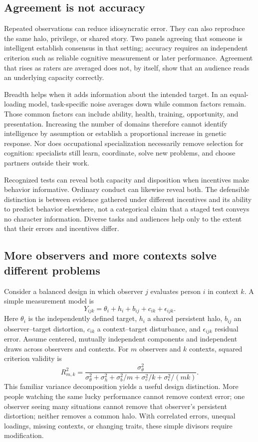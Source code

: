 \documentclass[10pt,twocolumn,letterpaper]{article}
\begin{document}
\subsection{Agreement is not accuracy}
Repeated observations can reduce idiosyncratic error. They can also reproduce the same halo, privilege, or shared story. Two panels agreeing that someone is intelligent establish consensus in that setting; accuracy requires an independent criterion such as reliable cognitive measurement or later performance. Agreement that rises as raters are averaged does not, by itself, show that an audience reads an underlying capacity correctly.

Breadth helps when it adds information about the intended target. In an equal-loading model, task-specific noise averages down while common factors remain. Those common factors can include ability, health, training, opportunity, and presentation. Increasing the number of domains therefore cannot identify intelligence by assumption or establish a proportional increase in genetic response. Nor does occupational specialization necessarily remove selection for cognition: specialists still learn, coordinate, solve new problems, and choose partners outside their work.

Recognized tests can reveal both capacity and disposition when incentives make behavior informative. Ordinary conduct can likewise reveal both. The defensible distinction is between evidence gathered under different incentives and its ability to predict behavior elsewhere, not a categorical claim that a staged test conveys no character information. Diverse tasks and audiences help only to the extent that their errors and incentives differ.

\subsection{More observers and more contexts solve different problems}
Consider a balanced design in which observer $j$ evaluates person $i$ in context $k$. A simple measurement model is
\begin{equation}
Y_{ijk}=\theta_i+h_i+b_{ij}+c_{ik}+\epsilon_{ijk}.
\label{eq:contexts}
\end{equation}
Here $\theta_i$ is the independently defined target, $h_i$ a shared persistent halo, $b_{ij}$ an observer--target distortion, $c_{ik}$ a context--target disturbance, and $\epsilon_{ijk}$ residual error. Assume centered, mutually independent components and independent draws across observers and contexts. For $m$ observers and $k$ contexts, squared criterion validity is
\begin{equation}
R^2_{m,k}=\frac{\sigma_\theta^2}{\sigma_\theta^2+\sigma_h^2+\sigma_b^2/m+\sigma_c^2/k+\sigma_\epsilon^2/(mk)}.
\label{eq:twoway}
\end{equation}
This familiar variance decomposition yields a useful design distinction. More people watching the same lucky performance cannot remove context error; one observer seeing many situations cannot remove that observer's persistent distortion; neither removes a common halo. With correlated errors, unequal loadings, missing contexts, or changing traits, these simple divisors require modification.
\end{document}
